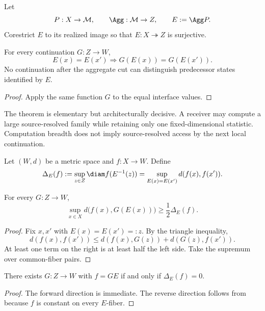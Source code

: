 Let
\[
P:X\to\mathcal M,
\qquad
\Agg:\mathcal M\to Z,
\qquad
E:=\Agg P.
\]
Corestrict $E$ to its realized image so that $E:X\twoheadrightarrow Z$ is surjective.

\begin{theorem}\label{thm:aggregation-fiber}
For every continuation $G:Z\to W$,
\[
E(x)=E(x')
\Longrightarrow
G(E(x))=G(E(x')).
\]
No continuation after the aggregate cut can distinguish predecessor states identified by $E$.
\end{theorem}

\begin{proof}
Apply the same function $G$ to the equal interface values.
\end{proof}

The theorem is elementary but architecturally decisive. A receiver may compute a large source-resolved family while retaining only one fixed-dimensional statistic. Computation breadth does not imply source-resolved access by the next local continuation.

\begin{definition}\label{def:fiber-variation}
Let $(W,d)$ be a metric space and $f:X\to W$. Define
\[
\Delta_E(f)
:=
\sup_{z\in Z}\diam f(E^{-1}(z))
=
\sup_{E(x)=E(x')}d(f(x),f(x')).
\]
\end{definition}

\begin{theorem}\label{thm:deterministic-lower-bound}
For every $G:Z\to W$,
\[
\boxed{
\sup_{x\in X}d\bigl(f(x),G(E(x))\bigr)
\ge
\frac12\Delta_E(f).
}
\]
\end{theorem}

\begin{proof}
Fix $x,x'$ with $E(x)=E(x')=:z$. By the triangle inequality,
\[
d(f(x),f(x'))
\le d(f(x),G(z))+d(G(z),f(x')).
\]
At least one term on the right is at least half the left side. Take the supremum over common-fiber pairs.
\end{proof}

\begin{corollary}\label{cor:exact-recoverability}
There exists $G:Z\to W$ with $f=GE$ if and only if $\Delta_E(f)=0$.
\end{corollary}

\begin{proof}
The forward direction is immediate. The reverse direction follows from  because $f$ is constant on every $E$-fiber.
\end{proof}

